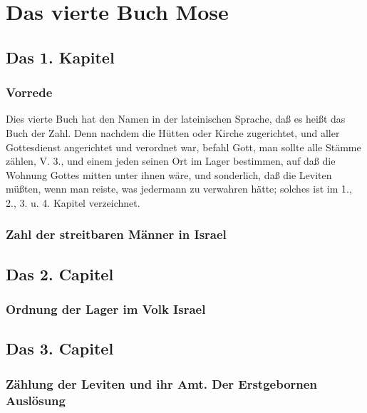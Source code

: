 
\part{Das vierte Buch Mose}

\chapter{Das 1. Kapitel}

\section{Vorrede}

Dies vierte Buch hat den Namen in der lateinischen Sprache, daß es heißt das Buch der Zahl. Denn nachdem die Hütten oder Kirche zugerichtet, und aller Gottesdienst angerichtet und verordnet war, befahl Gott, man sollte alle Stämme zählen, V. 3., und einem jeden seinen Ort im Lager bestimmen, auf daß die Wohnung Gottes mitten unter ihnen wäre, und sonderlich, daß die Leviten müßten, wenn man reiste, was jedermann zu verwahren hätte; solches ist im 1., 2., 3. u. 4. Kapitel verzeichnet.

\section{Zahl der streitbaren Männer in Israel}

\chapter{Das 2. Capitel}

\section{Ordnung der Lager im Volk Israel}

\chapter{Das 3. Capitel}

\section[Zählung der Leviten und ihr Amt. Der Erstgebornen]{Zählung der Leviten und ihr Amt. Der Erstgebornen Auslösung}

